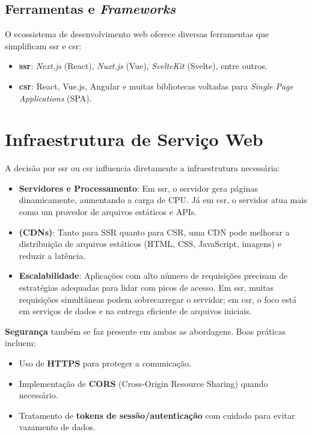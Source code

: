 \subsection{Ferramentas e \textit{Frameworks}}
\label{subsec:ferramentas-frameworks}
O ecossistema de desenvolvimento web oferece diversas ferramentas que simplificam \acrshort{ssr} e \acrshort{csr}:

\begin{itemize}
    \item \textbf{\acrshort{ssr}}: \textit{Next.js} (React), \textit{Nuxt.js} (Vue), \textit{SvelteKit} (Svelte), entre outros.
    \item \textbf{\acrshort{csr}}: React, Vue.js, Angular e muitas bibliotecas voltadas para \textit{Single Page Applications} (SPA).
\end{itemize}


\section{Infraestrutura de Serviço Web}
\label{sec:infraestrutura-web}

A decisão por \acrshort{ssr} ou \acrshort{csr} influencia diretamente a infraestrutura necessária:

\begin{itemize}
    \item \textbf{Servidores e Processamento}: Em \acrshort{ssr}, o servidor gera páginas dinamicamente, aumentando a carga de CPU. Já em \acrshort{csr}, o servidor atua mais como um provedor de arquivos estáticos e APIs.
    \item \textbf{ (CDNs)}: Tanto para SSR quanto para CSR, uma CDN pode melhorar a distribuição de arquivos estáticos (HTML, CSS, JavaScript, imagens) e reduzir a latência.
    \item \textbf{Escalabilidade}: Aplicações com alto número de requisições precisam de estratégias adequadas para lidar com picos de acesso. Em \acrshort{ssr}, muitas requisições simultâneas podem sobrecarregar o servidor; em \acrshort{csr}, o foco está em serviços de dados e na entrega eficiente de arquivos iniciais.
\end{itemize}

\textbf{Segurança} também se faz presente em ambas as abordagens. Boas práticas incluem:
\begin{itemize}
    \item Uso de \textbf{HTTPS} para proteger a comunicação.
    \item Implementação de \textbf{CORS} (Cross-Origin Resource Sharing) quando necessário.
    \item Tratamento de \textbf{tokens de sessão/autenticação} com cuidado para evitar vazamento de dados.
\end{itemize}

